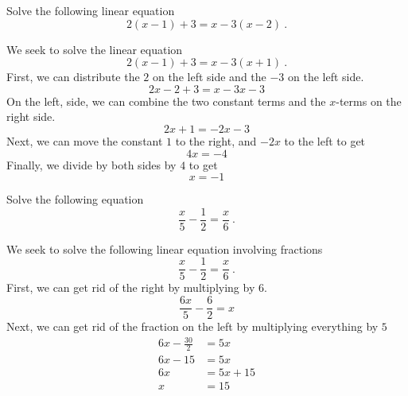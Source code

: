 \documentclass[addpoints,12pt]{exam}
\begin{document}
\begin{center}
\end{center}
\vspace{0.1in}
\vspace{0.2in}




\begin{questions}
	\question Solve the following linear equation 
   \[
 2(x-1)+3 = x-3(x-2)~.
\]

 \begin{solution}
We seek to solve the linear equation 
   \[
 2(x-1)+3 = x-3(x+1)~.
\]
First, we can distribute the $2$ on the left side and the $-3$ on the left side. 
\[
2x-2 +3 = x - 3x -3 
\]
On the left, side, we can combine the two constant terms and the $x$-terms on the right side. 
\[
2x +1 = -2x -3
\]
Next, we can move the constant $1$ to the right, and $-2x$ to the left to get 
\[
4x = -4 
\]
Finally, we divide by both sides by $4$ to get 
\[
x = -1 
\]
 \end{solution}
 
\question Solve the following equation 
\[
 \frac{x}{5}- \frac{1}{2} = \frac{x}{6}~.
\]

\begin{solution}
	We seek to solve the following  linear equation involving fractions 
\[
 \frac{x}{5}- \frac{1}{2} = \frac{x}{6}~.
\]
    First, we can get rid of the right by multiplying by $6$. 
		\[
		 \frac{6x}{5} - \frac{6}{2} = x
	 \] 
	 Next, we can get rid of the fraction on the left by multiplying everything by $5$ 
	 \begin{align*}
		 6x - \frac{30}{2} & = 5x \\
		 6x - 15 & = 5x \\
		 6x & = 5x + 15 \\
		 x & = 15 \\
	 \end{align*}
\end{solution}


\end{questions}
\end{document}
